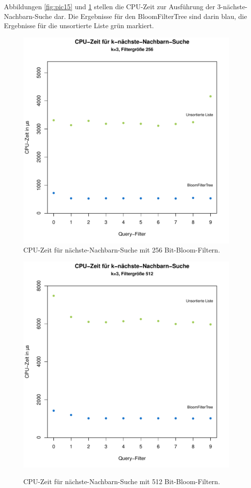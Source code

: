 Abbildungen \ref{fig:pic15} und \ref{fig:pic16} stellen die CPU-Zeit zur Ausführung der 3-nächste-Nachbarn-Suche dar. Die Ergebnisse für den BloomFilterTree sind darin blau, die Ergebnisse für die unsortierte Liste grün markiert.  
\begin{figure}[hptb]
	\centering
	\includegraphics[scale=0.7]{pictures/cputime_nn3_256.pdf}\\
	\caption[CPU-Zeit für 3-nächste-Nachbarn-Suche mit 256 Bit-Bloom-Filtern]{CPU-Zeit für nächste-Nachbarn-Suche mit 256 Bit-Bloom-Filtern.}\label{fig:pic15}
	\includegraphics[scale=0.7]{pictures/cputime_nn3_512.pdf}\\
	\caption[CPU-Zeit für 3-nächste-Nachbarn-Suche mit 512 Bit-Bloom-Filtern]{CPU-Zeit für nächste-Nachbarn-Suche mit 512 Bit-Bloom-Filtern.}\label{fig:pic16}
\end{figure}
